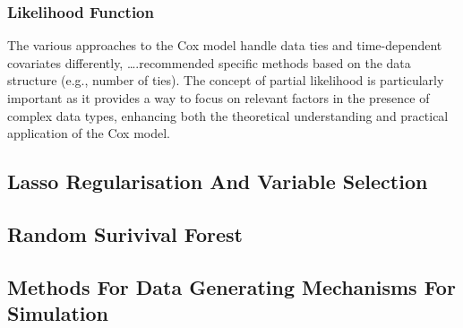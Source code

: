 \subsubsection{Likelihood Function}
The various approaches to the Cox model handle data ties and time-dependent covariates differently, ….recommended specific methods based on the data structure (e.g., number of ties). The concept of partial likelihood is particularly important as it provides a way to focus on relevant factors in the presence of complex data types, enhancing both the theoretical understanding and practical application of the Cox model.


\subsection{Lasso Regularisation And Variable Selection}

\subsection{Random Surivival Forest}

\subsection{Methods For Data Generating Mechanisms For Simulation}

